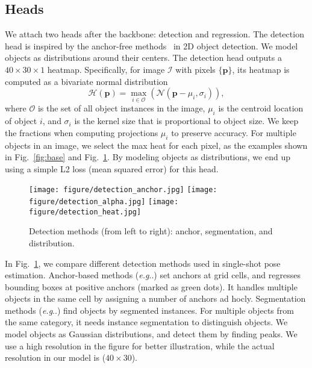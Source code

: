 \documentclass[runningheads]{llncs}
\makeatletter
\DeclareRobustCommand\onedot{\futurelet\@let@token\@onedot}
\def\@onedot{\ifx\@let@token.\else.\null\fi\xspace}
\def\eg{\emph{e.g}\onedot} \def\Eg{\emph{E.g}\onedot}
\makeatother
\begin{document}
\subsection{Heads}\label{sec:head}
We attach two heads after the backbone: detection and regression. The detection head is inspired by the anchor-free methods~\cite{Law_2018_CornerNet,Zhou_2019_CenterNet} in 2D object detection. We model objects as distributions around their centers. The detection head outputs a $40\times30\times1$ heatmap. Specifically, for image $\mathcal{I}$ with pixels $\{\mathbf{p}\}$, its heatmap is computed as a bivariate normal distribution~\cite{Ding_2019_Distribution} 
\begin{equation}
\label{eq:heat}
\mathcal{H}(\mathbf{p}) = \underset{i \in \mathcal{O}}{\max} (\mathcal{N}(\mathbf{p} - \mu_i, \sigma_i)),
\end{equation}
where $\mathcal{O}$ is the set of all object instances in the image, $\mu_i$ is the centroid location of object $i$, and $\sigma_i$ is the kernel size that is proportional to object size. We keep the fractions when computing projections $\mu_i$ to preserve accuracy. For multiple objects in an image, we select the max heat for each pixel, as the examples shown in Fig.~\ref{fig:base} and Fig.~\ref{fig:detection}. By modeling objects as distributions, we end up using a simple L2 loss (mean squared error) for this head.

\begin{figure}[t]
    \centering
    \texttt{[image: figure/detection\_anchor.jpg]}\hspace{5pt}
    \texttt{[image: figure/detection\_alpha.jpg]}\hspace{5pt}
    \texttt{[image: figure/detection\_heat.jpg]}
    \caption{Detection methods (from left to right): anchor, segmentation, and distribution.}
    \label{fig:detection}
\end{figure}

In Fig.~\ref{fig:detection}, we compare different detection methods used in single-shot pose estimation. Anchor-based methods (\eg \cite{Tekin_2018_SingleShot}) set anchors at grid cells, and regresses bounding boxes at positive anchors (marked as green dots). It handles multiple objects in the same cell by assigning a number of anchors ad hocly. Segmentation methods (\eg \cite{Hu_2019_Segmentation}) find objects by segmented instances. For multiple objects from the same category, it needs instance segmentation to distinguish objects. We model objects as Gaussian distributions, and detect them by finding peaks. We use a high resolution in the figure for better illustration, while the actual resolution in our model is ($40\times30$).
\end{document}
